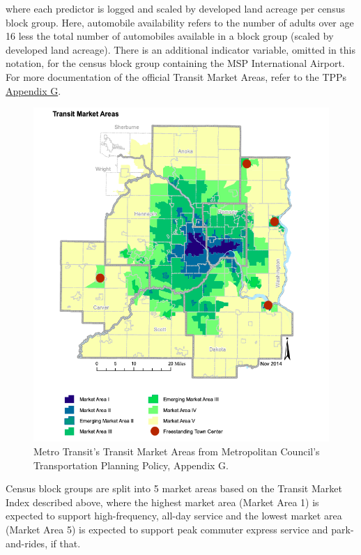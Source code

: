 \documentclass[]{article}
\begin{document}
where each predictor is logged and scaled by developed land acreage per
census block group. Here, automobile availability refers to the number
of adults over age 16 less the total number of automobiles available in
a block group (scaled by developed land acreage). There is an additional
indicator variable, omitted in this notation, for the census block group
containing the MSP International Airport. For more documentation of the
official Transit Market Areas, refer to the TPPs
\href{https://metrocouncil.org/Transportation/Planning-2/Key-Transportation-Planning-Documents/Transportation-Policy-Plan/The-Adopted-2040-TPP-(1)/Final-2040-Transportation-Policy-Plan/2040-TPP-Appendix-G-Transit-Design-and-Perf-Standa.aspx}{Appendix
G}.

\begin{figure}[htb]
  \centering
  \includegraphics[width = 5in]{TMA.png}
  \caption{Metro Transit's Transit Market Areas from Metropolitan Council's Transportation Planning Policy, Appendix G. }
\end{figure}

Census block groups are split into 5 market areas based on the Transit
Market Index described above, where the highest market area (Market Area
1) is expected to support high-frequency, all-day service and the lowest
market area (Market Area 5) is expected to support peak commuter express
service and park-and-rides, if that.
\end{document}
